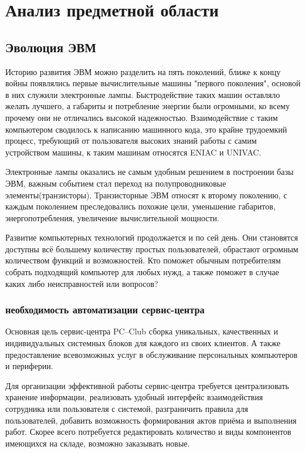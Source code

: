 \section{Анализ предметной области}
\subsection{Эволюция ЭВМ}

Историю развития ЭВМ можно разделить на пять поколений, ближе к концу войны появлялись первые вычислительные машины "первого поколения", основой в них служили электронные лампы. Быстродействие таких машин оставляло желать лучшего, а габариты и потребление энергии были огромными, ко всему прочему они не отличались высокой надежностью. Взаимодействие с таким компьютером сводилось к написанию машинного кода, это крайне трудоемкий процесс, требующий от пользователя высоких знаний работы с самим устройством машины, к таким машинам относятся ENIAC и UNIVAC.

Электронные лампы оказались не самым удобным решением в построении базы ЭВМ, важным событием стал переход на полупроводниковые элементы(транзисторы). Транзисторные ЭВМ относят к второму поколению, с каждым поколением преследовались похожие цели, уменьшение габаритов, энергопотребления, увеличение вычислительной мощности.

Развитие компьютерных технологий продолжается и по сей день. Они становятся доступны всё большему количеству простых пользователей, обрастают огромным количеством функций и возможностей. Кто поможет обычным потребителям собрать подходящий компьютер для любых нужд, а также поможет в случае каких либо неисправностей или вопросов?

\subsubsection{необходимость автоматизации сервис-центра}
Основная цель сервис-центра PC--Club сборка уникальных, качественных и индивидуальных системных блоков для каждого из своих клиентов. А также предоставление всевозможных услуг в обслуживание персональных компьютеров и периферии. 

Для организации эффективной работы сервис-центра требуется централизовать хранение информации, реализовать удобный интерфейс взаимодействия сотрудника или пользователя с системой, разграничить правила для пользователей, добавить возможность формирования актов приёма и выполнения работ. Скорее всего потребуется редактировать количество и виды компонентов имеющихся на складе, возможно заказывать новые.

